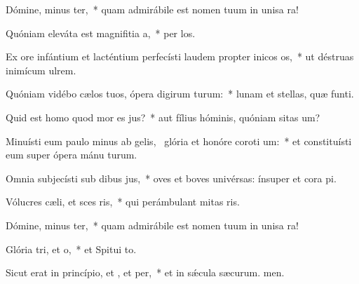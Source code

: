 \item Dómine, minus ter,~* quam admirábile est nomen tuum in unisa ra!
\item Quóniam eleváta est magnifitia a,~* per los.
\item Ex ore infántium et lacténtium perfecísti laudem propter inicos os,~* ut déstruas inimícum  ulrem.
\item Quóniam vidébo cælos tuos, ópera digirum turum:~* lunam et stellas, quæ  funti.
\item Quid est homo quod mor es jus?~* aut fílius hóminis, quóniam sitas um?
\item Minuísti eum paulo minus ab gelis,~\pscross{} glória et honóre coroti um:~* et constituísti eum super ópera mánu turum.
\item Omnia subjecísti sub dibus jus,~* oves et boves univérsas: ínsuper et cora pi.
\item Vólucres cæli, et sces ris,~* qui perámbulant mitas ris.
\item Dómine, minus ter,~* quam admirábile est nomen tuum in unisa ra!
\item Glória tri, et o,~* et Spitui to.
\item Sicut erat in princípio, et , et per,~* et in sǽcula sæcurum. men.
